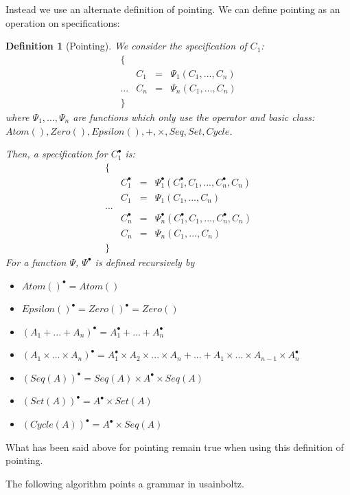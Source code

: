 \documentclass{article}
\newtheorem{definition}{Definition}
\begin{document}
Instead we use an alternate definition of pointing. We can define pointing as an operation on specifications:
\begin{definition}[Pointing]
We consider the specification of $C_1$:
\begin{align*}
\{\\
&C_1 &= &\Psi_1(C_1, ..., C_n)\\
...
&C_n &= &\Psi_n(C_1, ..., C_n)\\ 
\}
\end{align*}
where $\Psi_1, ..., \Psi_n$ are functions which only use the operator and basic class: $Atom(), Zero(), Epsilon(), +, \times, Seq, Set, Cycle$.

Then, a specification for $C_1^{\bullet}$ is:
\begin{align*}
\{&\\
&C_1^{\bullet} &= &\Psi_1^{\bullet}(C_1^{\bullet}, C_1, ..., C_n^{\bullet}, C_n)\\
&C_1 &= &\Psi_1(C_1, ..., C_n)\\
...\\
&C_n^{\bullet} &= &\Psi_n^{\bullet}(C_1^{\bullet}, C_1, ..., C_n^{\bullet}, C_n)\\
&C_n &= &\Psi_n(C_1, ..., C_n)\\ 
\}&
\end{align*}
For a function $\Psi$, $\Psi^{\bullet}$ is defined recursively by
\begin{itemize}
    \item
    $Atom()^{\bullet} = Atom()$
    \item
    $Epsilon()^{\bullet} = Zero()^{\bullet} = Zero()$
    \item
    $(A_1 + ... + A_n)^{\bullet} = A_1^{\bullet} + ... + A_n^{\bullet}$
    \item
    $(A_1 \times ... \times A_n)^{\bullet} = A_1^{\bullet} \times A_2 \times ... \times A_n + ... + A_1 \times ... \times A_{n-1} \times A_n^{\bullet}$
    \item
    $(Seq(A))^{\bullet} = Seq(A) \times A^{\bullet} \times Seq(A)$
    \item
    $(Set(A))^{\bullet} = A^{\bullet} \times Set(A)$
    \item
    $(Cycle(A))^{\bullet} = A^{\bullet} \times Seq(A)$
\end{itemize}
\end{definition}

What has been said above for pointing remain true when using this definition of pointing.

The following algorithm points a grammar in usainboltz.
\end{document}
